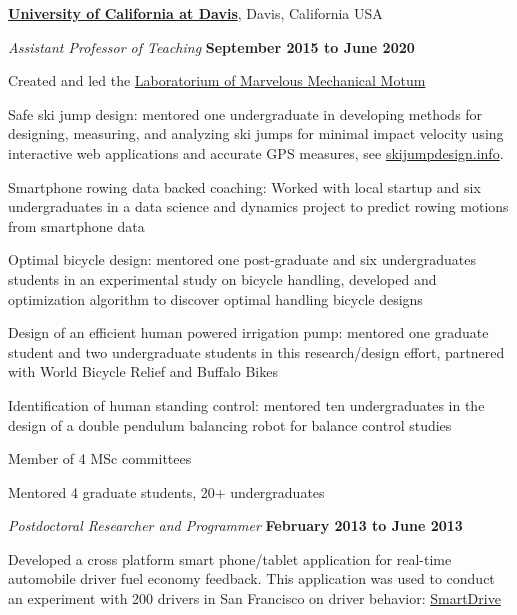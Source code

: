 \documentclass[10pt]{article}
\newenvironment{outerlist}[1][\enskip\textbullet]%
        {\begin{itemize}[#1]}{\end{itemize}%
         \vspace{-.6\baselineskip}}
\newenvironment{innerlist}[1][\enskip\textbullet]%
        {\begin{compactitem}[#1]}{\end{compactitem}}
\begin{document}
\href{http://www.ucdavis.edu}{\textbf{University of California at Davis}}, Davis, California USA
\begin{outerlist}
  \item[] \textit{Assistant Professor of Teaching}%
        \hfill \textbf{September 2015 to June 2020}
  \begin{innerlist}
    \item Created and led the \href{http://mechmotum.github.io}{Laboratorium of
      Marvelous Mechanical Motum}
    \item Safe ski jump design: mentored one undergraduate in developing
      methods for designing, measuring, and analyzing ski jumps for minimal
      impact velocity using interactive web applications and accurate GPS
      measures, see \href{http://www.skijumpdesign.info}{skijumpdesign.info}.
    \item Smartphone rowing data backed coaching: Worked with local startup and
      six undergraduates in a data science and dynamics project to predict
      rowing motions from smartphone data
    \item Optimal bicycle design: mentored one post-graduate and six
      undergraduates students in an experimental study on bicycle handling,
      developed and optimization algorithm to discover optimal handling bicycle
      designs
    \item Design of an efficient human powered irrigation pump: mentored one
      graduate student and two undergraduate students in this research/design
      effort, partnered with World Bicycle Relief and Buffalo Bikes
    \item Identification of human standing control: mentored ten undergraduates
      in the design of a double pendulum balancing robot for balance control
      studies
    \item Member of 4 MSc committees
    \item Mentored 4 graduate students, 20+ undergraduates
  \end{innerlist}
  \item[] \textit{Postdoctoral Researcher and Programmer}%
        \hfill \textbf{February 2013 to June 2013}
  \begin{innerlist}
    \item Developed a cross platform smart phone/tablet application for
      real-time automobile driver fuel economy feedback. This application was
      used to conduct an experiment with 200 drivers in San Francisco on driver
      behavior: \href{http://smartdrive.ucdavis.edu}{SmartDrive}

\end{innerlist}
\end{outerlist}
\end{document}
